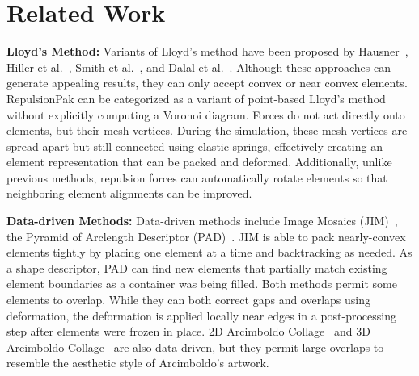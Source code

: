 \section{Related Work}
\label{repulsionpak_previous_work}


\newtext
{
\textbf{Lloyd's Method:}
Variants of Lloyd's method have been proposed by
Hausner~\cite{Hausner2001}, Hiller et al.~\cite{Hiller2003}, 
Smith et al.~\cite{Smith2005}, and Dalal et al.~\cite{Dalal2006}.
Although these approaches can generate appealing results, they can only accept
convex or near convex elements. 
RepulsionPak can be categorized as a variant of point-based Lloyd's method without explicitly computing a Voronoi diagram.
Forces do not act directly onto elements, but their mesh vertices.
During the simulation, these mesh vertices are spread apart but still connected using elastic springs,
effectively creating an element representation that can be packed and deformed.
Additionally, unlike previous methods, 
repulsion forces can automatically rotate elements so that neighboring element alignments can be improved. 
}




\newtext
{
\textbf{Data-driven Methods:}
Data-driven methods include Image Mosaics (JIM)~\cite{Kim2002}, 
the Pyramid of Arclength Descriptor (PAD)~\cite{Kwan2016}.
JIM is able to pack nearly-convex elements tightly by placing one element at a time and
backtracking as needed.  As a shape descriptor, 
PAD can find new elements that partially match
existing element boundaries as a container was being filled.  Both
methods permit some elements to overlap.  While they can
both correct gaps and overlaps using deformation, the deformation
is applied locally near edges in a post-processing step after
elements were frozen in place. 
2D {Arcimboldo} Collage~\cite{Huang2011} and 3D {Arcimboldo} Collage~\cite{Gal2007B}
are also data-driven, but they permit large overlaps to 
resemble the aesthetic style of Arcimboldo's artwork. 
}


